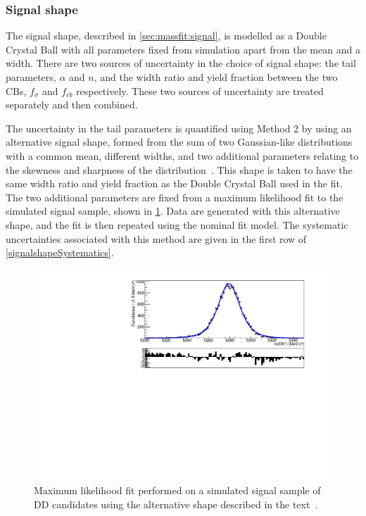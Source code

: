 \subsubsection{Signal shape}
\label{sec:systematics:signal}

The signal shape, described in \sect\ref{sec:massfit:signal}, is modelled as a Double Crystal Ball with all parameters fixed from simulation apart from the mean and a width. There are two sources of uncertainty in the choice of signal shape: the tail parameters, $\alpha$ and $n$, and the width ratio and yield fraction between the two CBs, $f_{\sigma}$ and $f_{cb}$ respectively. These two sources of uncertainty are treated separately and then combined. 

The uncertainty in the tail parameters is quantified using Method 2 by using an alternative signal shape, formed from the sum of two Gaussian-like distributions with a common mean, different widths, and two additional parameters relating to the skewness and sharpness of the distribution~\cite{doublejohnson}. This shape is taken to have the same width ratio and yield fraction as the Double Crystal Ball used in the \CP fit. The two additional parameters are fixed from a maximum likelihood fit to the simulated signal sample, shown in \fig\ref{signalshapesys}. Data are generated with this alternative shape, and the \CP fit is then repeated using the nominal fit model. The systematic uncertainties associated with this method are given in the first row of \tab\ref{signalshapeSystematics}.

\begin{figure}[h]
\centering
\includegraphics[width=0.7\linewidth]{figures/fitComponents/signalShape_DD_KPi_Johnson.pdf}
\caption{Maximum likelihood fit performed on a simulated signal sample of DD candidates using the alternative shape described in the text~\cite{doublejohnson}.}
\label{signalshapesys}
\end{figure}

